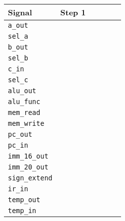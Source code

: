 \documentclass[a4paper,10pt]{article}
\begin{document}
\begin{enumerate}
\begin{enumerate}
\begin{center}
\begin{tabular}{|l|p{1.2cm}|p{1.2cm}|p{1.2cm}|p{1.2cm}|p{1.2cm}|}
\hline
\textbf{Signal} & \textbf{Step 1} & & & & \\
\hline
\texttt{a\_out} & & & & & \\
\hline
\texttt{sel\_a} & & & & & \\
\hline
\texttt{b\_out} & & & & & \\
\hline
\texttt{sel\_b} & & & & & \\
\hline
\texttt{c\_in} & & & & & \\
\hline
\texttt{sel\_c} & & & & & \\
\hline
\texttt{alu\_out} & & & & & \\
\hline
\texttt{alu\_func} & & & & & \\
\hline
\texttt{mem\_read} & & & & & \\
\hline
\texttt{mem\_write} & & & & & \\
\hline
\texttt{pc\_out} & & & & & \\
\hline
\texttt{pc\_in} & & & & & \\
\hline
\texttt{imm\_16\_out} & & & & & \\
\hline
\texttt{imm\_20\_out} & & & & & \\
\hline
\texttt{sign\_extend} & & & & & \\
\hline
\texttt{ir\_in} & & & & & \\
\hline
\texttt{temp\_out} & & & & & \\
\hline
\texttt{temp\_in} & & & & & \\
\hline
\end{tabular}
\end{center}


\end{enumerate}

\end{enumerate}
\end{document}
